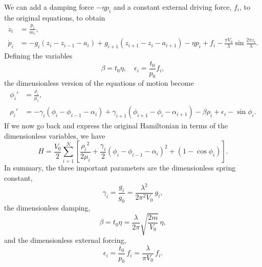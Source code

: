 \documentclass[11pt]{article}
\begin{document}
We can add a damping force $-\eta p_i$ and a constant external driving force, $f_i$, to the original equations, to obtain
\begin{align}
\dot{z}_i&=\frac{p_i}{m_i},\\
\dot{p}_i&=-g_i(z_i-z_{i-1}-a_i)
	+g_{i+1}(z_{i+1}-z_i-a_{i+1})
	-\eta p_i+f_i
	-\frac{\pi V_0}{\lambda}\sin\frac{2\pi z_i}{\lambda}.
\end{align}
Defining the variables
\begin{equation}
\beta=t_0\eta,\quad
\epsilon_i = \frac{t_0}{p_0}f_i,
\end{equation}
the dimensionless version of the equations of motion become
\begin{align}
\phi_i'&=\frac{\rho_i}{\mu_i},\\
\rho_i'&=-\gamma_i(\phi_i-\phi_{i-1}-\alpha_i)
	+\gamma_{i+1}(\phi_{i+1}-\phi_i-\alpha_{i+1})
	-\beta\rho_i+\epsilon_i
	-\sin\phi_i.
\end{align}
If we now go back and express the original Hamiltonian in terms of the dimensionless variables, we have
\begin{equation}
H=\frac{V_0}{2}\sum_{i=1}^N
	\left[\frac{{\rho_i}^2}{2\mu_i}
	+\frac{\gamma_i}{2}\left(\phi_i-\phi_{i-1}-\alpha_i\right)^2
	+\left(1-\cos\phi_i\right)\right].
\end{equation}
In summary, the three important parameters are the dimensionless spring constant,
\begin{equation}
\gamma_i=\frac{g_i}{g_0}=\frac{\lambda^2}{2\pi^2V_0}\,g_i,
\end{equation}
the dimensionless damping,
\begin{equation}
\beta=t_0\eta=\frac{\lambda}{2\pi}\sqrt{\frac{2m}{V_0}}\,\eta,
\end{equation}
and the dimensionless external forcing,
\begin{equation}
\epsilon_i=\frac{t_0}{p_0}\,f_i=\frac{\lambda}{\pi V_0}\,f_i.
\end{equation}
\end{document}
